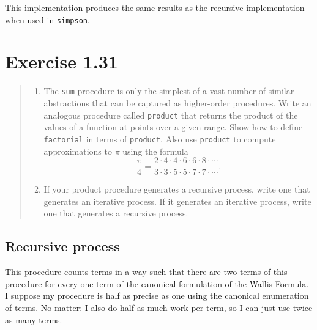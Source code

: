 \documentclass{article}
\begin{document}


This implementation produces the same results as the recursive implementation
when used in \texttt{simpson}.

\section{Exercise 1.31}
\begin{quote}
    \begin{enumerate}
        \item The \texttt{sum} procedure is only the simplest of a vast number
            of similar abstractions that can be captured as higher-order
            procedures. Write an analogous procedure called \texttt{product}
            that returns the product of the values of a function at points over
            a given range. Show how to define \texttt{factorial} in terms of
            \texttt{product}. Also use \texttt{product} to compute
            approximations to $\pi$ using the formula
            \begin{equation*}
                \frac{\pi}{4}=
                \frac{2\cdot4\cdot4\cdot6\cdot6\cdot8\cdot\cdots}
                     {3\cdot3\cdot5\cdot5\cdot7\cdot7\cdot\cdots}.
            \end{equation*}
        \item If your product procedure generates a recursive process, write
            one that generates an iterative process. If it generates an
            iterative process, write one that generates a recursive process.
    \end{enumerate}
\end{quote}

\subsection{Recursive process}





This procedure counts terms in a way such that there are two terms of this
procedure for every one term of the canonical formulation of the Wallis Formula.
I suppose my procedure is half as precise as one using the canonical enumeration
of terms. No matter: I also do half as much work per term, so I can just use
twice as many terms.
\end{document}
